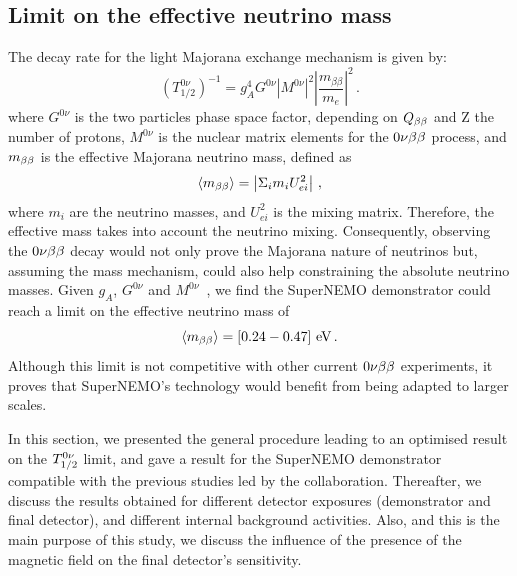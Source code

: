 
\subsection{Limit on the effective neutrino mass}

The decay rate for the light Majorana exchange mechanism is given by:
\begin{equation}
  (T_{1/2}^{0\nu})^{-1} = g_{A}^{4}G^{0\nu}|M^{0\nu}|^{2}\left\lvert\dfrac{m_{\beta\beta}}{m_{e}}\right\rvert^{2}\,.
\end{equation}
where $G^{0\nu}$ is the two particles phase space factor, depending on $Q_{\beta\beta}$ and Z the number of protons, $M^{0\nu}$ is the nuclear matrix elements for the $0\nu\beta\beta$ process, and $m_{\beta\beta}$ is the effective Majorana neutrino mass, defined as
\begin{equation}
  \langle m_{\beta\beta} \rangle = \left\vert \Sigma_{i}m_{i}U^{2}_{ei} \right\vert \,,
\end{equation}
where $m_{i}$ are the neutrino masses, and $U^{2}_{ei}$ is the mixing matrix.
Therefore, the effective mass takes into account the neutrino mixing.
Consequently, observing the $0\nu\beta\beta$ decay would not only prove the Majorana nature of neutrinos but, assuming the mass mechanism, could also help constraining the absolute neutrino masses.
Given $g_{A}$, $G^{0\nu}$ and $M^{0\nu}$~\cite{PhysRevC.85.034316}\cite{MENENDEZ2009139}\cite{PhysRevLett.116.112502}\cite{PhysRevC.91.034304}\cite{PhysRevC.91.024613}\cite{PhysRevC.87.045501}\cite{PhysRevLett.111.142501}\cite{PhysRevC.91.024316}\cite{PhysRevC.82.064310}\cite{PhysRevC.83.034320}, we find the SuperNEMO demonstrator could reach a limit on the effective neutrino mass of
\begin{equation}
\langle m_{\beta\beta}\rangle = [0.24-0.47]~\text{eV}\,.
\end{equation}
Although this limit is not competitive with other current $0\nu\beta\beta$ experiments, it proves that SuperNEMO's technology would benefit from being adapted to larger scales.

In this section, we presented the general procedure leading to an optimised result on the $T_{1/2}^{0\nu}$ limit, and gave a result for the SuperNEMO demonstrator compatible with the previous studies led by the collaboration.
Thereafter, we discuss the results obtained for different detector exposures (demonstrator and final detector), and different internal background activities.
Also, and this is the main purpose of this study, we discuss the influence of the presence of the magnetic field on the final detector's sensitivity.


